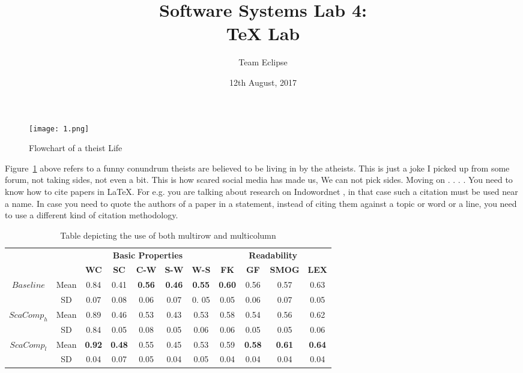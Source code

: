 \documentclass[12pt,a4paper,titlepage]{article}
\title{{\Huge {\bfseries Software Systems Lab 4:\\TeX Lab}}}
\author{\LARGE Team Eclipse}
\date{12th August, 2017}
\begin{document}
\maketitle
\begin{figure}[H]
  \texttt{[image: 1.png]}
  \caption{Flowchart of a theist Life}
  \label{fig:flowchart}
\end{figure}

Figure~\ref{fig:flowchart} above refers to a funny conundrum theists are believed to be living in by the atheists. This is just a joke I picked up from some forum, not taking sides, not even a bit. This is how scared social media has made us, We can not pick sides. Moving on . . . . You need to know how to cite papers in \LaTeX. For e.g. you are talking about research on Indowordnet \cite{indowordnet}, in that case such a citation must be used near a name. In case you need to quote the authors of a paper in a statement, instead of citing them against a topic or word or a line, you need to use a different kind of citation methodology.\\

\begin{table}[H]
  
  \caption{Table depicting the use of both multirow and multicolumn} \label{table:1}
  \begin{adjustbox}{width=1\textwidth}
    \begin{tabular}{ccc|c|c|c|c|c|c|c|c|c|}
      \cline{4-12}
      & & & \multicolumn{5}{c|}{\textbf{Basic Properties}} & \multicolumn{4}{c|}{\textbf{Readability}} \\ \cline{4-12} 
      & & & \textbf{WC} & \textbf{SC} & \textbf{C-W} & \textbf{S-W} & \textbf{W-S} & \textbf{FK} & \textbf{GF} & \textbf{SMOG} & \textbf{LEX} \\ \hline
      \multicolumn{2}{|c|}{\multirow{2}{*}{$Baseline$}} & Mean & 0.84 & 0.41 & \textbf{0.56} & \textbf{0.46} & \textbf{0.55} & \textbf{0.60} & 0.56 & 0.57 & 0.63 \\ \cline{3-12} 
      \multicolumn{2}{|c|}{} & SD & 0.07 & 0.08 & 0.06 & 0.07 & 0. 05 & 0.05 & 0.06 & 0.07 & 0.05 \\ \hline
      \multicolumn{2}{|c|}{\multirow{2}{*}{$ScaComp_h$}} & Mean & 0.89 & 0.46 & 0.53 & 0.43 & 0.53 & 0.58 & 0.54 & 0.56 & 0.62 \\ \cline{3-12} 
      \multicolumn{2}{|c|}{} & SD & 0.84 & 0.05 & 0.08 & 0.05 & 0.06 & 0.06 & 0.05 & 0.05 & 0.06 \\ \hline
      \multicolumn{2}{|c|}{\multirow{2}{*}{$ScaComp_l$}} & Mean & \textbf{0.92} & \textbf{0.48} & 0.55 & 0.45 & 0.53 & 0.59 & \textbf{0.58} & \textbf{0.61} & \textbf{0.64} \\ \cline{3-12} 
      \multicolumn{2}{|c|}{} & SD & 0.04 & 0.07 & 0.05 & 0.04 & 0.05 & 0.04 & 0.04 & 0.04 & 0.04 \\ \hline
    \end{tabular}
  \end{adjustbox}
\end{table}
\end{document}
